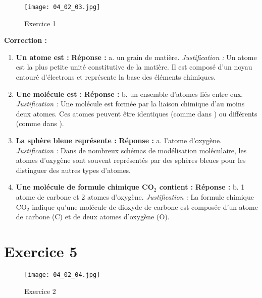 \documentclass[a4paper,12pt]{article}
\begin{document}
\begin{figure}[H]
  \centering
  \texttt{[image: 04\_02\_03.jpg]}
  \caption{\label{} Exercice 1}
\end{figure}

\textbf{Correction :}

\begin{enumerate}
    \item \textbf{Un atome est :} \newline
    \textbf{Réponse :} a. un grain de matière. \newline
    \textit{Justification :} Un atome est la plus petite unité constitutive de la matière. Il est composé d'un noyau entouré d'électrons et représente la base des éléments chimiques.

    \item \textbf{Une molécule est :} \newline
    \textbf{Réponse :} b. un ensemble d'atomes liés entre eux. \newline
    \textit{Justification :} Une molécule est formée par la liaison chimique d'au moins deux atomes. Ces atomes peuvent être identiques (comme dans ) ou différents (comme dans ).

    \item \textbf{La sphère bleue représente :} \newline
    \textbf{Réponse :} a. l'atome d'oxygène. \newline
    \textit{Justification :} Dans de nombreux schémas de modélisation moléculaire, les atomes d'oxygène sont souvent représentés par des sphères bleues pour les distinguer des autres types d'atomes.

    \item \textbf{Une molécule de formule chimique CO$_2$ contient :} \newline
    \textbf{Réponse :} b. 1 atome de carbone et 2 atomes d'oxygène. \newline
    \textit{Justification :} La formule chimique CO$_2$ indique qu'une molécule de dioxyde de carbone est composée d'un atome de carbone (C) et de deux atomes d'oxygène (O).
\end{enumerate}

\section{Exercice 5}

\begin{figure}[H]
  \centering
  \texttt{[image: 04\_02\_04.jpg]}
  \caption{\label{} Exercice 2}
\end{figure}
\end{document}
